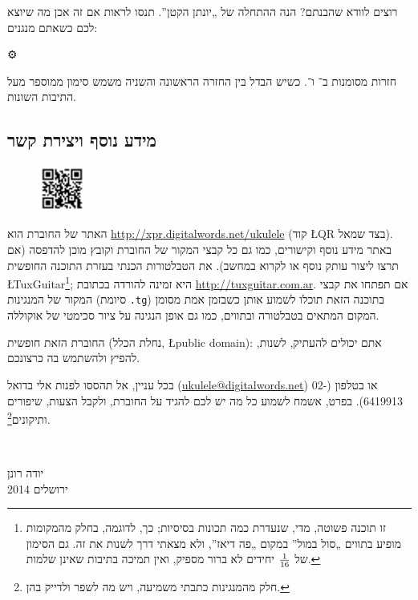 רוצים לוודא שהבנתם? הנה ההתחלה של „יונתן הקטן”. תנסו לראות אם זה אכן מה שיוצא לכם כשאתם מנגנים:

\begin{center}
	⚙
%
\end{center}

חזרות מסומנות ב־ ו־. כשיש הבדל בין החזרה הראשונה והשניה משמש סימון  ממוספר מעל התיבות השונות.



\subsection*{מידע נוסף ויצירת קשר}

\begin{figure}\vspace{-\baselineskip}\includegraphics[width=1.5cm]{retejo.png}\end{figure}
	האתר של החוברת הוא \url{http://xpr.digitalwords.net/ukulele} (קוד \L{QR} בצד שמאל). באתר מידע נוסף וקישורים, כמו גם כל קבצי המקור של החוברת וקובץ מוכן להדפסה (אם תרצו ליצור עותק נוסף או לקרוא במחשב). את הטבלטורות הכנתי בעזרת התוכנה החופשית \L{TuxGuitar}\footnote{זו תוכנה פשוטה, מדי, שנעדרת כמה תכונות בסיסיות; כך, לדוגמה, בחלק מהמקומות מופיע בתווים „סול במול” במקום „פה דיאז”, ולא מצאתי דרך לשנות את זה. גם הסימון של ${1}\over{16}$ יחידים לא ברור מספיק, ואין תמיכה בתיבות שאינן שלמות.}; היא זמינה להורדה בכתובת \url{http://tuxguitar.com.ar}. אם תפתחו את קבצי המקור של המנגינות (סיומת \texttt{.tg}) בתוכנה הזאת תוכלו לשמוע אותן כשבזמן אמת מסומן המקום המתאים בטבלטורה ובתווים, כמו גם אופן הנגינה על ציור סכימטי של אוקוללה.

החוברת הזאת חופשית (נחלת הכלל, \L{public domain}): אתם יכולים להעתיק, לשנות, להפיץ ולהשתמש בה כרצונכם.

בכל עניין, אל תהססו לפנות אלי בדואל (\url{ukulele@digitalwords.net}) או בטלפון (02-6419913). בפרט, אשמח לשמוע כל מה יש לכם להגיד על החוברת, ולקבל הצעות, שיפורים ותיקונים\footnote{חלק מהמנגינות כתבתי משמיעה, ויש מה לשפר ולדייק בהן.}.

\vspace{\baselineskip}
~\hfill
\begin{minipage}{3cm}
	יודה רונן\\
	ירושלים 2014\\
\end{minipage}
